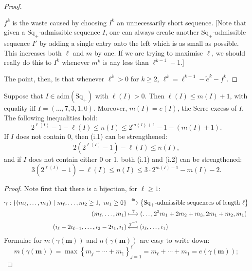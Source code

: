 \documentclass[10pt]{article}
\newcommand{\admis}[1]{\mathrm{adm}(#1)}%
\newcommand{\SqShift}{\Sq_{+}}
\newcommand{\Sq}{\mathrm{Sq}}
\newcommand{\minDim}{m}
\begin{document}
\begin{KoszulSequenceCombinatorics}
\begin{Omitted}
\begin{proof}
\begin{itemise}
\item $f^k$ is the waste caused by choosing $I^k$ an unnecessarily short sequence. [Note that given a $\SqShift$-admissible sequence $I$, one can always create another $\SqShift$-admissible sequence $I'$ by adding a single entry onto the left which is as small as possible. This increases both $\ell$ and $\minDim$ by one. If we are trying to maximise $\ell$, we should really do this to $I^k$ whenever $\minDim^k$ is any less than $\ell^{k-1}-1$.]
\end{itemise}
The point, then, is that whenever $\ell^k>0$ for $k\geq2$, $\ell^k=\ell^{k-1}-\widetilde{e}^k-f^k$.
\end{proof}
\end{Omitted}

\begin{lem}
Suppose that $I\in\admis{\SqShift}$ with $\ell(I)>0$. Then $\ell(I)\leq \minDim(I)+1$, with equality iff $I=(\ldots,7,3,1,0)$. Moreover, $\minDim(I)=e(I)$, the Serre excess of $I$. The following inequalities hold:
\begin{equation}
2^{\ell(I)}-1-\ell(I)\leq n(I)\leq2^{\minDim(I)+1}-1-(\minDim(I)+1).\tag{i.1) \& (i.2}
\end{equation}
If $I$ does not contain 0, then \textup{(i.1)} can be strengthened:
\[2(2^{\ell(I)}-1)-\ell(I)\leq n(I),\]
and if $I$ does not contain either 0 or 1, both \textup{(i.1)} and \textup{(i.2)} can be strengthened:
\[3(2^{\ell(I)}-1)-\ell(I)\leq n(I)\leq 3\cdot2^{\minDim(I)-1}-\minDim(I)-2.\]
\end{lem}
\begin{proof}
Note first that there is a bijection, for $\ell\geq1$:
\begin{alignat*}{2}
\gamma:\left\{(m_{\ell},\ldots,m_1)\ \middle|\ m_\ell,\ldots,m_2\geq1,\ m_1\geq0\right\}&\overset{\cong}{\to}\left\{\textup{$\SqShift$-admissible sequences of length $\ell$}\right\}
\\
(m_\ell,\ldots,m_1)
&\overset{\gamma}{\mapsto}
(\ldots,2^2m_1+2m_2+m_3,2m_1+m_2,m_1)\\
(i_\ell-2i_{\ell-1},\ldots,i_2-2i_1,i_1)
&\overset{\gamma^{-1}}{\mapsfrom}
(i_\ell,\ldots,i_1)%
\end{alignat*}
Formulae for $m(\gamma(\textbf{m}))$ and $n(\gamma(\textbf{m}))$ are easy to write down:
\[m(\gamma(\textbf{m}))=\max\left\{m_j+\cdots +m_1\right\}_{j=1}^\ell=m_\ell+\cdots +m_1=e(\gamma(\textbf{m}));\]
\[%
\]
\end{proof}
\end{KoszulSequenceCombinatorics}
\end{document}
